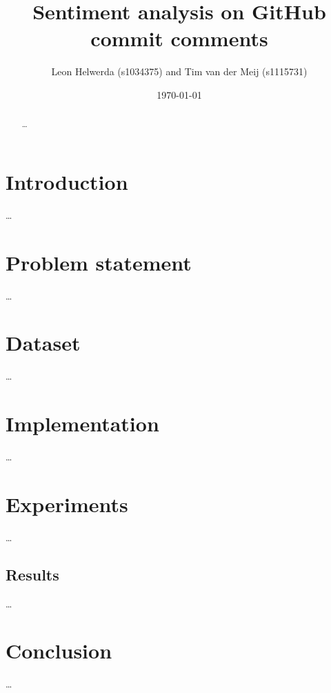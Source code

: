 \documentclass{article}
\begin{document}
\title{Sentiment analysis on GitHub commit comments}
\author{Leon Helwerda (s1034375) and Tim van der Meij (s1115731)}
\date{\today}
\maketitle

\begin{abstract}
    \ldots
\end{abstract}

\section{Introduction}\label{sec:introduction}
\ldots

\section{Problem statement}\label{sec:problem}
\ldots

\section{Dataset}\label{sec:dataset}
\ldots

\section{Implementation}\label{sec:implementation}
\ldots

\section{Experiments}\label{sec:experiments}
\ldots

\subsection{Results}\label{sec:results}
\ldots

\section{Conclusion}\label{sec:conclusion}
\ldots
\end{document}
